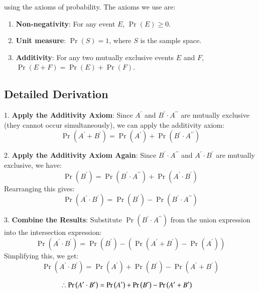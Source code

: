 \documentclass[journal]{IEEEtran}
\begin{document}
using the axioms of probability. The axioms we use are:

\begin{enumerate}
    \item \textbf{Non-negativity}: For any event \(E\), \(\Pr(E) \geq 0\).
    \item \textbf{Unit measure}: \(\Pr(S) = 1\), where \(S\) is the sample space.
    \item \textbf{Additivity}: For any two mutually exclusive events \(E\) and \(F\), \(\Pr(E + F) = \Pr(E) + \Pr(F)\).
\end{enumerate}



\subsection*{Detailed Derivation}


1. \textbf{Apply the Additivity Axiom}:
   Since \(A^{\prime}\) and \(B^{\prime} \cdot A^{\prime\prime}\) are mutually exclusive (they cannot occur simultaneously), we can apply the additivity axiom:
   \[
   \Pr(A^{\prime} + B^{\prime}) = \Pr(A^{\prime}) + \Pr(B^{\prime} \cdot A^{\prime\prime})
   \]


2. \textbf{Apply the Additivity Axiom Again}:
   Since \(B^{\prime} \cdot A^{\prime\prime}\) and \(A^{\prime} \cdot B^{\prime}\) are mutually exclusive, we have:
   \[
   \Pr(B^{\prime}) = \Pr(B^{\prime} \cdot A^{\prime\prime}) + \Pr(A^{\prime} \cdot B^{\prime})
   \]
   Rearranging this gives:
   \[
   \Pr(A^{\prime} \cdot B^{\prime}) = \Pr(B^{\prime}) - \Pr(B^{\prime} \cdot A^{\prime\prime})
   \]

3. \textbf{Combine the Results}:
   Substitute \(\Pr(B^{\prime} \cdot A^{\prime\prime})\) from the union expression into the intersection expression:
   \[
   \Pr(A^{\prime} \cdot B^{\prime}) = \Pr(B^{\prime}) - (\Pr(A^{\prime} + B^{\prime}) - \Pr(A^{\prime}))
   \]
   Simplifying this, we get:
   \[
   \Pr(A^{\prime} \cdot B^{\prime}) = \Pr(A^{\prime}) + \Pr(B^{\prime}) - \Pr(A^{\prime} + B^{\prime})
   \]

\begin{align}      
    \therefore  \Pr\left(A^\prime \cdot B^\prime\right) &= \Pr\left(A^\prime\right) + \Pr\left(B^\prime\right) - \Pr\left(A^\prime + B^\prime\right)
\end{align}
\end{document}
